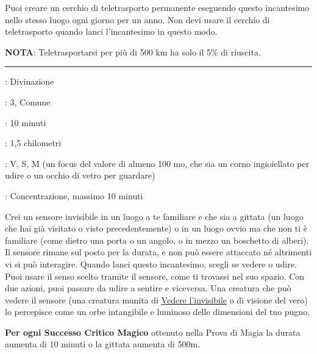 \begin{multicols}{2}
Puoi creare un cerchio di teletrasporto permanente eseguendo questo incantesimo nello stesso luogo ogni giorno per un anno. Non devi usare il cerchio di teletrasporto quando lanci l'incantesimo in questo modo.

\textbf{NOTA}: Teletrasportarsi per più di 500 km ha solo il 5\% di riuscita.

\smallskip\noindent\rule{\linewidth}{2pt} \hypertarget{Chiaroveggenza}{}\smallskip{}
\noindent
\begin{description}[noitemsep, topsep=0pt, parsep=0pt, partopsep=0pt, leftmargin=0cm, labelwidth=2.8cm]
	\item[\textbf{Lista di Magia}]: Divinazione
	\item[\textbf{Livello}]: 3, Comune
	\item[\textbf{T. di Lancio}]: 10 minuti
	\item[\textbf{Gittata}]: 1,5 chilometri
	\item[\textbf{Componenti}]: V, S, M (un focus del valore di almeno 100 mo, che sia un corno ingioiellato per udire o un occhio di vetro per guardare)
	\item[\textbf{Durata}]: Concentrazione, massimo 10 minuti
\end{description}

Crei un sensore invisibile in un luogo a te familiare e che sia a gittata (un luogo che hai già visitato o visto precedentemente) o in un luogo ovvio ma che non ti è familiare (come dietro una porta o un angolo, o in mezzo un boschetto di alberi). Il sensore rimane sul posto per la durata, e non può essere attaccato né altrimenti vi si può interagire. Quando lanci questo incantesimo, scegli se vedere o udire. Puoi usare il senso scelto tramite il sensore, come ti trovassi nel suo spazio. Con due azioni, puoi passare da udire a sentire e viceversa. Una creatura che può vedere il sensore (una creatura munita di \hyperlink{Vedere l'invisibile}{Vedere l'invisibile} o di visione del vero) lo percepisce come un orbe intangibile e luminoso delle dimensioni del tuo pugno.

\textbf{Per ogni Successo Critico Magico} ottenuto nella Prova di Magia la durata aumenta di 10 minuti o la gittata aumenta di 500m.


\end{multicols}
